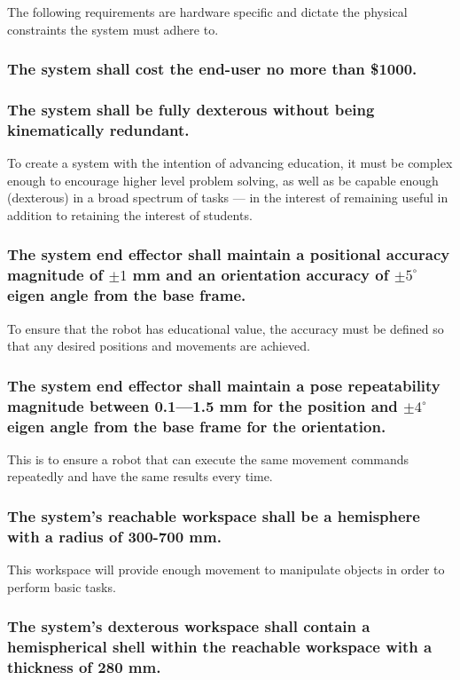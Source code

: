 The following requirements are hardware specific and dictate the physical constraints the system must adhere to.
\subsubsection{The system shall cost the end-user no more than \$1000.}
\subsubsection{The system shall be fully dexterous without being kinematically redundant.}
To create a system with the intention of advancing education, it must be complex enough to encourage higher level problem solving, as well as be capable enough (dexterous) in a broad spectrum of tasks — in the interest of remaining useful in addition to retaining the interest of students.

\subsubsection{The system end effector shall maintain a positional accuracy magnitude of \(\pm 1\) mm and an orientation accuracy of \(\pm 5^{\circ}\) eigen angle from the base frame.}
To ensure that the robot has educational value, the accuracy must be defined so that any desired positions and movements are achieved.

\subsubsection{The system end effector shall maintain a pose repeatability magnitude between 0.1—1.5 mm for the position and \(\pm 4^{\circ}\) eigen angle from the base frame for the orientation.}
This is to ensure a robot that can execute the same movement commands repeatedly and have the same results every time.

\subsubsection{The system’s reachable workspace shall be a hemisphere with a radius of 300-700 mm.}
This workspace will provide enough movement to manipulate objects in order to perform basic tasks.

\subsubsection{The system’s dexterous workspace shall contain a hemispherical shell within the reachable workspace with a thickness of 280 mm.}

